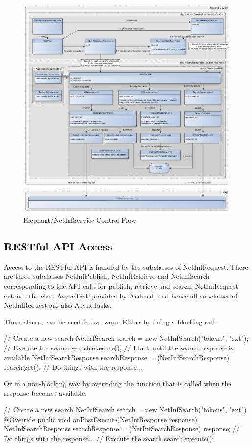 \begin{figure}[h!]
	\centering
		\includegraphics[width=1\textwidth]{./img/flowchart}
    	\caption{Elephant/NetInfService Control Flow}
	\label{fig:controlflow}
\end{figure}

\subsection{RESTful API Access}

Access to the RESTful API is handled by the subclasses of NetInfRequest. There are three subclasses NetInfPublish, NetInfRetrieve and NetInfSearch corresponding to the API calls for publish, retrieve and search. NetInfRequest extends the class AsyncTask provided by Android, and hence all subclasses of NetInfRequest are also AsyncTasks.

These classes can be used in two ways. Either by doing a blocking call:

\begin{code}[language=Java]
	// Create a new search
	NetInfSearch search = new NetInfSearch("tokens", "ext");
	// Execute the search
	search.execute();
	// Block until the search response is available
	NetInfSearchResponse searchResponse =
	        (NetInfSearchResponse) search.get();
	// Do things with the response...
\end{code}

Or in a non-blocking way by overriding the function that is called when the response becomes available:

\begin{code}[language=Java]
	// Create a new search
	NetInfSearch search = new NetInfSearch("tokens", "ext") {
            @Override
            public void onPostExecute(NetInfResponse response) {
                NetInfSearchResponse searchResponse =
                        (NetInfSearchResponse) response;
				// Do things with the response...
            }
    }
    // Execute the search
	search.execute();
\end{code}